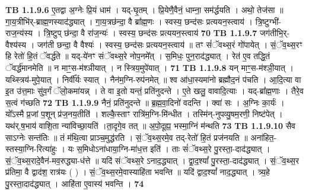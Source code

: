 \documentclass[17pt]{extarticle}
\begin{document}
                  \newline
                                \textbf{ TB 1.1.9.6} \newline
                  ए॒तद्वा अ॒ग्नेः प्रि॒यं धाम॑ । यद्-घृ॒तम् । प्रि॒येणै॒वैनं॒ धाम्ना॒ सम॑र्द्धयति । अथो॒ तेज॑सा ॥ गा॒य॒त्रीभि॑र्-ब्राह्म॒णस्याद॑द्ध्यात् । गा॒य॒त्रछ॑न्दा॒ वै ब्रा᳚ह्म॒णः । स्वस्य॒ छन्द॑सः प्रत्ययन॒स्त्वाय॑ । त्रि॒ष्टुग्भी॑-राज॒न्य॑स्य । त्रि॒ष्टुप् छ॑न्दा॒ वै रा॑ज॒न्यः॑ । स्वस्य॒ छन्द॑सः प्रत्ययन॒स्त्वाय॑ \textbf{ 70} \newline
                  \newline
                                \textbf{ TB 1.1.9.7} \newline
                  जग॑तीभि॒र्-वैश्य॑स्य । जग॑ती छन्दा॒ वै वैश्यः॑ । स्वस्य॒ छन्द॑सः प्रत्ययन॒स्त्वाय॑ ॥ तꣳ सं॑ॅवथ्स॒रं गो॑पायेत् । सं॒ॅव॒थ्स॒रꣳ हि रेतो॑ हि॒तं ॅवर्द्ध॑ते ॥ यद्-ये॑नꣳ संॅवथ्स॒रे नोप॒नमे᳚त् । स॒मिधः॒ पुन॒राद॑द्ध्यात् । रेत॑ ए॒व तद्धि॒तं ॅवर्द्ध॑मानमेति ॥ न माꣳ॒॒स-म॑श्ञीयात् । न स्त्रिय॒मुपे॑यात् । \textbf{ 71} \newline
                  \newline
                                \textbf{ TB 1.1.9.8} \newline
                  यन् माꣳ॒॒स-म॑श्ञी॒यात् । यथ्स्त्रिय॑-मुपे॒यात् । निर्वी᳚र्यः स्यात् । नैन॑म॒ग्नि-रुप॑नमेत् ॥ श्व आ॑धा॒स्यमा॑नो ब्रह्मौद॒नं प॑चति । आ॒दि॒त्या वा इ॒त उ॑त्त॒माः सु॑व॒र्गं ॅलो॒कमा॑यन्न् । ते वा इ॒तो यन्तं॒ प्रति॑नुदन्ते । ए॒ते खलु॒ वावादि॒त्याः । यद्-ब्रा᳚ह्म॒णाः । तैरे॒व स॒त्वं ग॑च्छति \textbf{ 72} \newline
                  \newline
                                \textbf{ TB 1.1.9.9} \newline
                  नैनं॒ प्रति॑नुदन्ते ॥ ब्र॒ह्म॒वा॒दिनो॑ वदन्ति । क्वा॑ सः । अ॒ग्निः का॒र्यः॑ । यो᳚ऽस्मै प्र॒जां प॒शून् प्र॑ज॒नय॒तीति॑ । शल्कै॒स्ताꣳ रात्रि॑म॒ग्नि-मि॑न्धीत । तस्मि॑न्-नुपव्यु॒षम॒रणी॒ निष्ट॑पेत् । यथ॑र्.ष॒भाय॑ वाशि॒ता न्या॑विच्छा॒यति॑ ।ता॒दृगे॒व तत् ॥ अ॒पो॒दूह्य॒ भस्मा॒ग्निं म॑न्थति \textbf{ 73} \newline
                  \newline
                                \textbf{ TB 1.1.9.10} \newline
                  सैव साऽग्नेः सन्त॑तिः ॥ तं म॑थि॒त्वा प्राञ्च॒मुद्ध॑रति । सं॒ॅव॒थ्स॒रमे॒व तद्-रेतो॑ हि॒तं प्रज॑नयति ॥ अना॑हित॒-स्तस्या॒ग्नि-रित्या॑हुः । यः स॒मिधोऽना॑धाया॒ग्नि-मा॑ध॒त्त इति॑ । ताः सं॑ॅवथ्स॒रे पु॒रस्ता॒-दाद॑द्ध्यात् । सं॒ॅव॒थ्स॒रादे॒वैन॑-मव॒रुद्ध्या-ध॑त्ते ॥ यदि॑ संॅवथ्स॒रे ऽनाद॒द्ध्यात् । द्वा॒द॒श्यां᳚ पु॒रस्ता॒-दाद॑द्ध्यात् । सं॒ॅव॒थ्स॒र प्र॑तिमा॒ वै द्वाद॑श॒ रात्र॑यः ( ) । सं॒ॅव॒थ्स॒रमे॒वास्याहि॑ता भवन्ति ॥ यदि॑ द्वाद॒श्यां᳚ नाद॒द्ध्यात् । त्र्य॒हे पु॒रस्ता॒दाद॑द्ध्यात् । आहि॑ता ए॒वास्य॑ भवन्ति । \textbf{ 74} \newline
\end{document}
